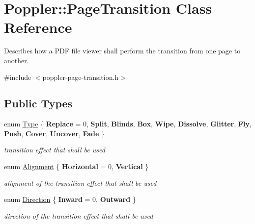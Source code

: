 \hypertarget{class_poppler_1_1_page_transition}{}\section{Poppler\+:\+:Page\+Transition Class Reference}
\label{class_poppler_1_1_page_transition}


Describes how a P\+DF file viewer shall perform the transition from one page to another.  




{\ttfamily \#include $<$poppler-\/page-\/transition.\+h$>$}

\subsection*{Public Types}
\begin{DoxyCompactItemize}
\item 
\mbox{\label{class_poppler_1_1_page_transition_a2155276b5334c1cb5513531a45d7ab81}} 
enum \hyperlink{class_poppler_1_1_page_transition_a2155276b5334c1cb5513531a45d7ab81}{Type} \{ \newline
{\bfseries Replace} = 0, 
{\bfseries Split}, 
{\bfseries Blinds}, 
{\bfseries Box}, 
\newline
{\bfseries Wipe}, 
{\bfseries Dissolve}, 
{\bfseries Glitter}, 
{\bfseries Fly}, 
\newline
{\bfseries Push}, 
{\bfseries Cover}, 
{\bfseries Uncover}, 
{\bfseries Fade}
 \}\begin{DoxyCompactList}\small\item\em transition effect that shall be used \end{DoxyCompactList}
\item 
\mbox{\label{class_poppler_1_1_page_transition_a11f69733573c7f71837bf43e273e955f}} 
enum \hyperlink{class_poppler_1_1_page_transition_a11f69733573c7f71837bf43e273e955f}{Alignment} \{ {\bfseries Horizontal} = 0, 
{\bfseries Vertical}
 \}\begin{DoxyCompactList}\small\item\em alignment of the transition effect that shall be used \end{DoxyCompactList}
\item 
\mbox{\label{class_poppler_1_1_page_transition_a0b592cf88c5dce23191f8129ca1e0046}} 
enum \hyperlink{class_poppler_1_1_page_transition_a0b592cf88c5dce23191f8129ca1e0046}{Direction} \{ {\bfseries Inward} = 0, 
{\bfseries Outward}
 \}\begin{DoxyCompactList}\small\item\em direction of the transition effect that shall be used \end{DoxyCompactList}
\end{DoxyCompactItemize}
